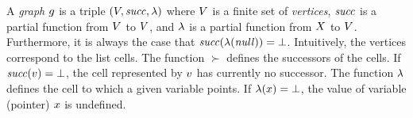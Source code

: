 A  {\it graph}
$g$ is a triple $\left(V,{\it succ},\lambda\right)$
where $V$ is a finite set of {\it vertices},
${\it succ}$ is a partial function from $V$ to $V$, and
$\lambda$ is a partial function from $X$ to $V$.
%
Furthermore, it is always the case that ${\it succ}(\lambda({\it null}))=\bot$.
%
Intuitively, the vertices correspond to the list cells.
%
The function $\succ$ defines the successors of the cells.
%
If ${\it succ}(v)=\bot$, %
the cell represented by $v$ has currently no successor.
%
The function $\lambda$ defines the cell to which a given variable points.
%
If $\lambda(x)=\bot$, %
the value of variable (pointer) $x$ is undefined.
%
% 

